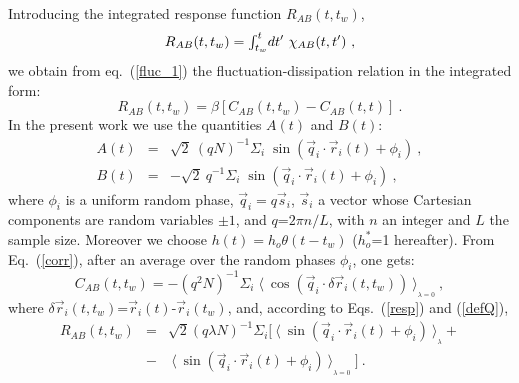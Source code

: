 Introducing the integrated response function $R_{AB}(t,t_w)$,
\begin{equation}
R_{AB} (t,t_w)= \makebox{$\int_{t_w}^{t}$} dt'\  \chi_{AB}(t,t') \ ,
\label{defQ}
\end{equation}
we obtain from eq.~(\ref{fluc_1}) the fluctuation-dissipation relation
in the integrated form:
\begin{equation}
R_{AB} (t,t_w)=\beta \left[ C_{AB}(t,t_w)-C_{AB}(t,t)\right]\ .
\label{fluc_2}
\end{equation}
In the present work we use the quantities $A(t)$ and $B(t)$:
\begin{eqnarray}
A(t) &=& \sqrt2\  (qN)^{-1} \Sigma_i \; \sin ( {\vec q}_i 
 \cdot {\vec r}_i(t) + \phi_i )  \ ,
\label{var_a}
\\
B(t) &=& - \sqrt2\   q^{-1} \Sigma_i \; \sin ( {\vec q}_i 
 \cdot {\vec r}_i(t) + \phi_i )  \ ,
\label{var_b}
\end{eqnarray}
where $\phi_i$ is a uniform random phase, ${\vec q}_i = q {\vec s}_i$,
${\vec s}_i$ a vector whose Cartesian components are random
variables $\pm 1$, and $q$=$2\pi n/L$, with $n$ an integer and $L$ the sample
size. Moreover we choose $h(t)=h_o\theta (t-t_w)$ ($h^*_o$=1 hereafter).
From Eq.~(\ref{corr}), after an average over the  random phases $\phi_i$,
one gets:
\begin{equation}
C_{AB}(t,t_w)= - (q^2N)^{-1}\Sigma_i \; \langle\ 
\cos ( {\vec q}_i \cdot \delta {\vec r}_i(t,t_w) )
\ \rangle_{_{\lambda=0}} \ ,
\label{corrAB}
\end{equation}
where $\delta {\vec r}_i (t,t_w)$=${\vec r}_i(t)$-${\vec r}_i(t_w)$, 
and, according to Eqs.~(\ref{resp}) and (\ref{defQ}),
\begin{eqnarray}
\nonumber
R_{AB}(t,t_w)\!&=&\!\sqrt2(q\lambda N)^{-1} \Sigma_i [ \ 
\langle\ \sin ( {\vec q}_i \cdot {\vec r}_i(t) + \phi_i ) 
\ \rangle_{_{\lambda}}  +
\\ 
&-&\ \langle\ \sin ( {\vec q}_i \cdot {\vec r}_i(t) + \phi_i )\ 
\rangle_{_{\lambda=0}}\! \ ] \ .
\label{respAB}
\end{eqnarray}
